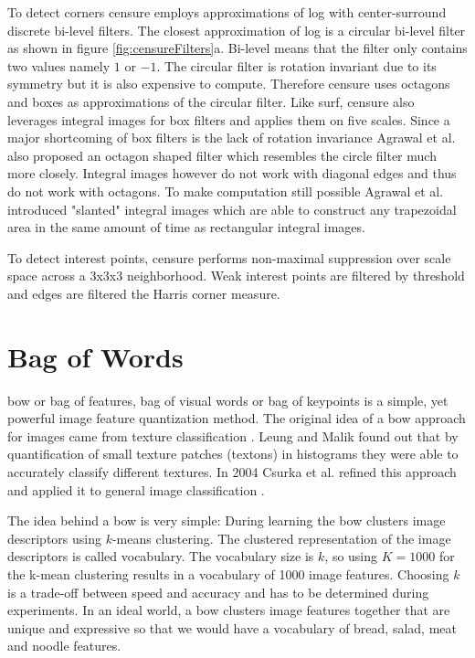 To detect corners \gls{censure} employs approximations of \gls{log} with center-surround discrete bi-level filters. The closest approximation of \gls{log} is a circular bi-level filter as shown in figure \ref{fig:censureFilters}a. Bi-level means that the filter only contains two values namely $1$ or $-1$. The circular filter is rotation invariant due to its symmetry but it is also expensive to compute. Therefore \gls{censure} uses octagons and boxes as approximations of the circular filter. Like \gls{surf}, \gls{censure} also leverages integral images for box filters and applies them on five scales. Since a major shortcoming of box filters is the lack of rotation invariance Agrawal et al. also proposed an octagon shaped filter which resembles the circle filter much more closely. Integral images however do not work with diagonal edges and thus do not work with octagons. To make computation still possible Agrawal et al. introduced "slanted" integral images which are able to construct any trapezoidal area in the same amount of time as rectangular integral images. 

To detect interest points, \gls{censure} performs non-maximal suppression over scale space across a 3x3x3 neighborhood. Weak interest points are filtered by threshold and edges are filtered the Harris corner measure.


\section{Bag of Words}
\acrfull{bow} or bag of features, bag of visual words or bag of keypoints is a simple, yet powerful image feature quantization method. The original idea of a \gls{bow} approach for images came from texture classification \cite{Leung2001}. Leung and Malik found out that by quantification of small texture patches {(textons)} in histograms they were able to accurately classify different textures. In 2004 Csurka et al. refined this approach and applied it to general image classification \cite{Csurka2004}.

The idea behind a \gls{bow} is very simple: During learning the \gls{bow} clusters image descriptors using $k$-means clustering. The clustered representation of the image descriptors is called vocabulary. The vocabulary size is $k$, so using $K=1000$ for the k-mean clustering results in a vocabulary of 1000 image features. Choosing $k$ is a trade-off between speed and accuracy and has to be determined during experiments. In an ideal world, a \gls{bow} clusters image features together that are unique and expressive so that we would have a vocabulary of bread, salad, meat and noodle features.

